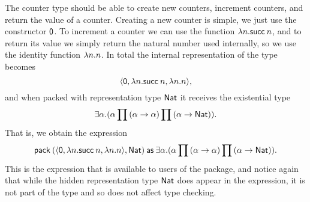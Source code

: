 The counter type should be able to create new counters, increment counters, and return the value of a counter. Creating a new counter is simple, we just use the constructor $\mathsf{0}$. To increment a counter we can use the function $\expLam{n}{\expSucc{n}}$, and to return its value we simply return the natural number used internally, so we use the identity function $\expLam{n}{n}$. In total the internal representation of the type becomes
%
\begin{equation*}
    \expTuple{
        \expZero,
        \expLam{n}{\expSucc{n}},
        \expLam{n}{n}
    },
\end{equation*}
%
and when packed with representation type $\mathsf{Nat}$ it receives the existential type
%
\begin{equation*}
    \typeExists{\alpha}{
        \typeProd*{
            \typeProd{\alpha}{\typeFunc*{\alpha}{\alpha}}
        }{
            \typeFunc*{\alpha}{\typeNat}
        }
    }.
\end{equation*}
%
That is, we obtain the expression
%
\begin{equation*}
    \expPackAs{
        \expTuple{
            \expZero,
            \expLam{n}{\expSucc{n}},
            \expLam{n}{n}
        }
    }{
        \typeNat
    }{
        \alpha
    }{
        \typeProd*{
            \typeProd{\alpha}{\typeFunc*{\alpha}{\alpha}}
        }{
            \typeFunc*{\alpha}{\typeNat}
        }
    }.
\end{equation*}
%
This is the expression that is available to users of the package, and notice again that while the hidden representation type $\mathsf{Nat}$ does appear in the expression, it is not part of the type and so does not affect type checking.

\newcommand{\expUnpackAs}[4]{\expr{unpack}\expspace#1\expspace\expr{as}\expspace(#2,#3)\expspace\expr{in}\expspace#4}

